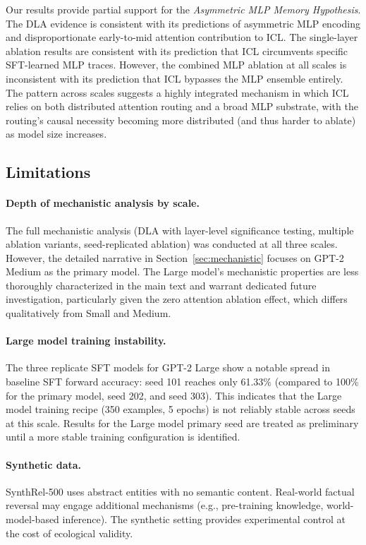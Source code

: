 \documentclass[11pt]{article}
\begin{document}
Our results provide partial support for the \emph{Asymmetric MLP Memory
Hypothesis}. The DLA evidence is consistent with its predictions of asymmetric
MLP encoding and disproportionate early-to-mid attention contribution to ICL.
The single-layer ablation results are consistent with its prediction that ICL
circumvents specific SFT-learned MLP traces. However, the combined MLP ablation
at all scales is inconsistent with its prediction that ICL bypasses the MLP
ensemble entirely. The pattern across scales suggests a highly integrated
mechanism in which ICL relies on both distributed attention routing and a broad
MLP substrate, with the routing's causal necessity becoming more distributed
(and thus harder to ablate) as model size increases.

\subsection{Limitations}
\label{sec:limitations}

\paragraph{Depth of mechanistic analysis by scale.} The full mechanistic
analysis (DLA with layer-level significance testing, multiple ablation
variants, seed-replicated ablation) was conducted at all three scales. However,
the detailed narrative in Section~\ref{sec:mechanistic} focuses on GPT-2 Medium
as the primary model. The Large model's mechanistic properties are less
thoroughly characterized in the main text and warrant dedicated future
investigation, particularly given the zero attention ablation effect, which
differs qualitatively from Small and Medium.

\paragraph{Large model training instability.} The three replicate SFT models
for GPT-2 Large show a notable spread in baseline SFT forward accuracy: seed 101
reaches only 61.33\% (compared to 100\% for the primary model, seed 202, and
seed 303). This indicates that the Large model training recipe (350 examples,
5 epochs) is not reliably stable across seeds at this scale. Results for the
Large model primary seed are treated as preliminary until a more stable training
configuration is identified.

\paragraph{Synthetic data.} SynthRel-500 uses abstract entities with no
semantic content. Real-world factual reversal may engage additional mechanisms
(e.g., pre-training knowledge, world-model-based inference). The synthetic
setting provides experimental control at the cost of ecological validity.
\end{document}
